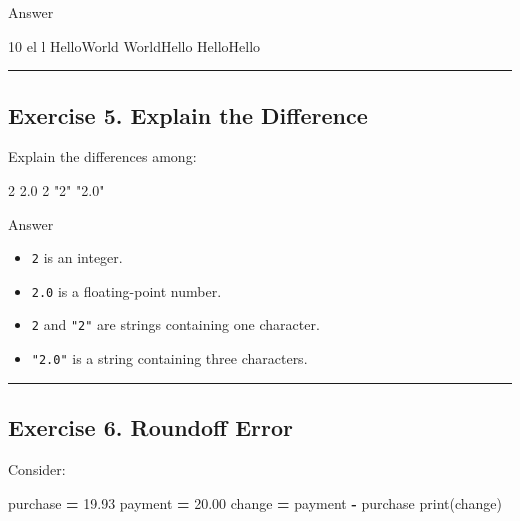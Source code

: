 \documentclass[
]{article}
\newenvironment{Shaded}{\begin{snugshade}}{\end{snugshade}}
\newcommand{\BuiltInTok}[1]{#1}
\newcommand{\FloatTok}[1]{\textcolor[rgb]{0.00,0.00,0.81}{#1}}
\newcommand{\NormalTok}[1]{#1}
\newcommand{\OperatorTok}[1]{\textcolor[rgb]{0.81,0.36,0.00}{\textbf{#1}}}
\providecommand{\tightlist}{%
  \setlength{\itemsep}{0pt}\setlength{\parskip}{0pt}}
\begin{document}
Answer

\begin{Shaded}
\begin{Highlighting}[]
\NormalTok{10}
\NormalTok{el}
\NormalTok{l}
\NormalTok{HelloWorld}
\NormalTok{WorldHello}
\NormalTok{HelloHello}
\end{Highlighting}
\end{Shaded}

\begin{center}\rule{0.5\linewidth}{0.5pt}\end{center}

\subsection{Exercise 5. Explain the
Difference}\label{exercise-5.-explain-the-difference}

Explain the differences among:

\begin{Shaded}
\begin{Highlighting}[]
\NormalTok{2}
\NormalTok{2.0}
\NormalTok{\textquotesingle{}2\textquotesingle{}}
\NormalTok{"2"}
\NormalTok{"2.0"}
\end{Highlighting}
\end{Shaded}

Answer

\begin{itemize}
\tightlist
\item
  \texttt{2} is an integer.
\item
  \texttt{2.0} is a floating-point number.
\item
  \texttt{\textquotesingle{}2\textquotesingle{}} and \texttt{"2"} are
  strings containing one character.
\item
  \texttt{"2.0"} is a string containing three characters.
\end{itemize}

\begin{center}\rule{0.5\linewidth}{0.5pt}\end{center}

\subsection{Exercise 6. Roundoff
Error}\label{exercise-6.-roundoff-error}

Consider:

\begin{Shaded}
\begin{Highlighting}[]
\NormalTok{purchase }\OperatorTok{=} \FloatTok{19.93}
\NormalTok{payment }\OperatorTok{=} \FloatTok{20.00}
\NormalTok{change }\OperatorTok{=}\NormalTok{ payment }\OperatorTok{{-}}\NormalTok{ purchase}
\BuiltInTok{print}\NormalTok{(change)}
\end{Highlighting}
\end{Shaded}
\end{document}
